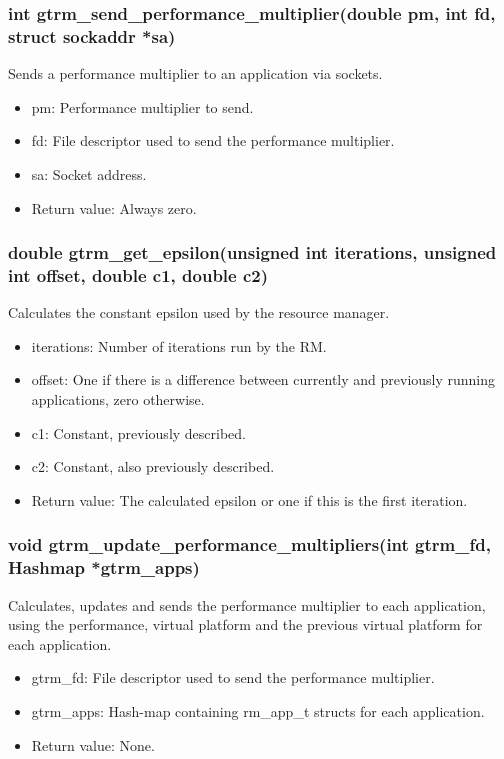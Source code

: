 \documentclass[nobiblatex]{LTHthesis}
\begin{document}
\subsubsection{int gtrm\_send\_performance\_multiplier(double pm, int fd, struct sockaddr *sa)}
Sends a performance multiplier to an application via sockets.
\begin{itemize} 
\item pm: Performance multiplier to send.
\item fd: File descriptor used to send the performance multiplier.
\item sa: Socket address.
\item Return value: Always zero.
\end{itemize}

\subsubsection{double gtrm\_get\_epsilon(unsigned int iterations, unsigned int offset, double c1, double c2)}
Calculates the constant epsilon used by the resource manager.
\begin{itemize} 
\item iterations: Number of iterations run by the RM.
\item offset: One if there is a difference between currently and previously running applications, zero otherwise.
\item c1: Constant, previously described.
\item c2: Constant, also previously described.
\item Return value: The calculated epsilon or one if this is the first iteration.
\end{itemize}

\subsubsection{void gtrm\_update\_performance\_multipliers(int gtrm\_fd, Hashmap *gtrm\_apps)}
Calculates, updates and sends the performance multiplier to each application, using the performance, virtual platform and the previous virtual platform for each application.
\begin{itemize} 
\item gtrm\_fd: File descriptor used to send the performance multiplier.
\item gtrm\_apps: Hash-map containing rm\_app\_t structs for each application.
\item Return value: None.
\end{itemize}
\end{document}
